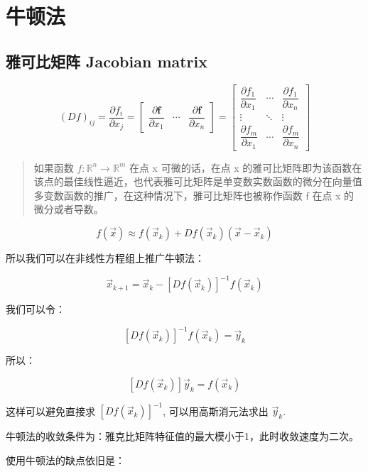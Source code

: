 \documentclass[
]{book}
\begin{document}
\hypertarget{ux725bux987fux6cd5}{%
\section{牛顿法}\label{ux725bux987fux6cd5}}

\hypertarget{ux96c5ux53efux6bd4ux77e9ux9635-jacobian-matrix}{%
\subsection{雅可比矩阵 Jacobian matrix}\label{ux96c5ux53efux6bd4ux77e9ux9635-jacobian-matrix}}

\[
(Df)_{ij} = \frac{\partial f_i}{\partial x_j} =  {\begin{bmatrix}{\dfrac {\partial \mathbf {f} }{\partial x_{1}}}&\cdots &{\dfrac {\partial \mathbf {f} }{\partial x_{n}}}\end{bmatrix}} 
= {\begin{bmatrix}{\dfrac {\partial f_{1}}{\partial x_{1}}}&\cdots &{\dfrac {\partial f_{1}}{\partial x_{n}}}\\\vdots &\ddots &\vdots \\{\dfrac {\partial f_{m}}{\partial x_{1}}}&\cdots &{\dfrac {\partial f_{m}}{\partial x_{n}}}\end{bmatrix}}
\]

\begin{quote}
如果函数 \(f: \mathbb{R}^n \to \mathbb{R}^m\) 在点 x 可微的话，在点 x 的雅可比矩阵即为该函数在该点的最佳线性逼近，也代表雅可比矩阵是单变数实数函数的微分在向量值多变数函数的推广，在这种情况下，雅可比矩阵也被称作函数 f 在点 x 的微分或者导数。
\end{quote}

\[
f(\vec{x}) \approx f(\vec{x}_k) + Df(\vec{x}_k)(\vec{x} - \vec{x}_k)
\]

所以我们可以在非线性方程组上推广牛顿法：

\[
\vec{x}_{k+1} = \vec{x}_k - [Df(\vec{x}_k)]^{-1} f(\vec{x}_k)
\]

我们可以令：

\[
[Df(\vec{x}_k)]^{-1} f(\vec{x}_k) = \vec{y}_k
\]

所以：

\[
[Df(\vec{x}_k)] \vec{y}_k = f(\vec{x}_k)
\]

这样可以避免直接求 \([Df(\vec{x}_k)]^{-1}\), 可以用高斯消元法求出 \(\vec{y}_k\).

牛顿法的收敛条件为：雅克比矩阵特征值的最大模小于1，此时收敛速度为二次。

使用牛顿法的缺点依旧是：
\end{document}
